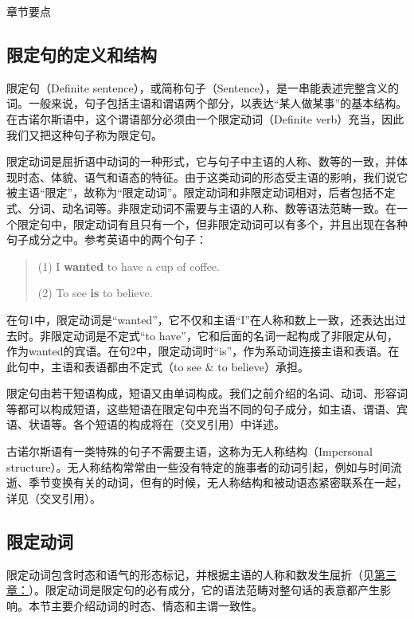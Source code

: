 章节要点

\subsection{限定句的定义和结构}\label{ux9650ux5b9aux53e5ux7684ux5b9aux4e49ux548cux7ed3ux6784}

限定句（Definite
sentence），或简称句子（Sentence），是一串能表述完整含义的词。一般来说，句子包括主语和谓语两个部分，以表达``某人做某事''的基本结构。在古诺尔斯语中，这个谓语部分必须由一个限定动词（Definite
verb）充当，因此我们又把这种句子称为限定句。

限定动词是屈折语中动词的一种形式，它与句子中主语的人称、数等的一致，并体现时态、体貌、语气和语态的特征。由于这类动词的形态受主语的影响，我们说它被主语``限定''，故称为``限定动词''。限定动词和非限定动词相对，后者包括不定式、分词、动名词等。非限定动词不需要与主语的人称、数等语法范畴一致。在一个限定句中，限定动词有且只有一个，但非限定动词可以有多个，并且出现在各种句子成分之中。参考英语中的两个句子：

\begin{quote}
(1) I \textbf{wanted} to have a cup of coffee.

(2) To see \textbf{is} to believe.
\end{quote}

在句1中，限定动词是``wanted''，它不仅和主语``I''在人称和数上一致，还表达出过去时。非限定动词是不定式``to
have''，它和后面的名词一起构成了非限定从句，作为wanted的宾语。在句2中，限定动词时``is''，作为系动词连接主语和表语。在此句中，主语和表语都由不定式（to
see \& to believe）承担。

限定句由若干短语构成，短语又由单词构成。我们之前介绍的名词、动词、形容词等都可以构成短语，这些短语在限定句中充当不同的句子成分，如主语、谓语、宾语、状语等。各个短语的构成将在（交叉引用）中详述。

古诺尔斯语有一类特殊的句子不需要主语，这称为无人称结构（Impersonal
structure）。无人称结构常常由一些没有特定的施事者的动词引起，例如与时间流逝、季节变换有关的动词，但有的时候，无人称结构和被动语态紧密联系在一起，详见（交叉引用）。

\subsection{限定动词}\label{ux9650ux5b9aux52a8ux8bcd}

限定动词包含时态和语气的形态标记，并根据主语的人称和数发生屈折（见\hyperref[ux52a8ux8bcdux4e0eux53d8ux4f4dux6cd5]{第三章：}）。限定动词是限定句的必有成分，它的语法范畴对整句话的表意都产生影响。本节主要介绍动词的时态、情态和主谓一致性。

